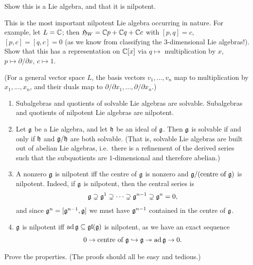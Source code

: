 \begin{example}
\begin{enumerate}
    \begin{exercise}
    Show this is a Lie algebra, and that it is nilpotent.
    \end{exercise}

    This is the most important nilpotent Lie algebra occurring in nature. For
    example, let $L = \mathbb{C}$; then $\mathfrak{H}_W = \mathbb{C} p + \mathbb{C} q + \mathbb{C} c$ with
    $[p, q] = c$, $[p, c] = [q, c] = 0$ (as we know from classifying the
    $3$-dimensional Lie algebras!). Show that this has a representation on
    $\mathbb{C}[x]$ via $q \mapsto$ multiplication by $x$, $p \mapsto \partial/\partial x$,
    $c \mapsto 1$.

    (For a general vector space $L$, the basis vectors $v_1, \dots, v_n$ map
    to multiplication by $x_1, \dots, x_n$, and their duals map to
    $\partial/\partial x_1, \dots, \partial/\partial x_n$.)
\end{enumerate}
\end{example}

\begin{properties}\leavevmode
\begin{enumerate}
  \item Subalgebras and quotients of solvable Lie algebras are solvable.
    Subalgebras and quotients of nilpotent Lie algebras are nilpotent.
  \item Let $\mathfrak{g}$ be a Lie algebra, and let $\mathfrak{h}$ be an ideal of $\mathfrak{g}$. Then $\mathfrak{g}$
    is solvable if and only if $\mathfrak{h}$ and $\mathfrak{g}/\mathfrak{h}$ are both solvable. (That is,
    solvable Lie algebras are built out of abelian Lie algebras, i.e.\ there
    is a refinement of the derived series such that the subquotients are
    $1$-dimensional and therefore abelian.)
  \item A nonzero $\mathfrak{g}$ is nilpotent iff the centre of $\mathfrak{g}$ is nonzero and
    $\mathfrak{g}/(\text{centre of } \mathfrak{g})$ is nilpotent. Indeed, if $\mathfrak{g}$ is nilpotent,
    then the central series is
    \[
      \mathfrak{g} \supsetneq \mathfrak{g}^1 \supsetneq \cdots \supsetneq \mathfrak{g}^{n-1} \supsetneq \mathfrak{g}^n = 0,
    \]
    and since $\mathfrak{g}^n = [\mathfrak{g}^{n-1}, \mathfrak{g}]$ we must have $\mathfrak{g}^{n-1}$ contained in the
    centre of $\mathfrak{g}$.
  \item $\mathfrak{g}$ is nilpotent iff $\operatorname{ad} \mathfrak{g} \subseteq \mathfrak{gl}(\mathfrak{g})$ is nilpotent, as we
    have an exact sequence
    \[
      0 \to \text{centre of } \mathfrak{g} \hookrightarrow \mathfrak{g} \twoheadrightarrow \operatorname{ad} \mathfrak{g} \to 0.
    \]
\end{enumerate}
\end{properties}

\begin{exercise}
Prove the properties. (The proofs should all be easy and tedious.)
\end{exercise}

